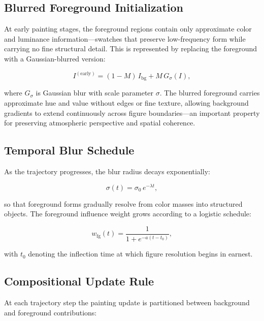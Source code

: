 \documentclass[12pt,a4paper]{article}
\theoremstyle{draftthm}
\begin{document}
\subsection{Blurred Foreground Initialization}

At early painting stages, the foreground regions contain only approximate color and luminance information---swatches that preserve low-frequency form while carrying no fine structural detail. This is represented by replacing the foreground with a Gaussian-blurred version:

\begin{equation}
  I^{(\mathrm{early})} = (1-M)\, I_{\mathrm{bg}} + M\, G_{\sigma}(I),
  \label{eq:early-image}
\end{equation}

where $G_{\sigma}$ is Gaussian blur with scale parameter $\sigma$. The blurred foreground carries approximate hue and value without edges or fine texture, allowing background gradients to extend continuously across figure boundaries---an important property for preserving atmospheric perspective and spatial coherence.

\subsection{Temporal Blur Schedule}

As the trajectory progresses, the blur radius decays exponentially:

\begin{equation}
  \sigma(t) = \sigma_0\, e^{-\lambda t},
  \label{eq:blur-schedule}
\end{equation}

so that foreground forms gradually resolve from color masses into structured objects. The foreground influence weight grows according to a logistic schedule:

\begin{equation}
  w_{\mathrm{fg}}(t) = \frac{1}{1 + e^{-a(t - t_0)}},
  \label{eq:fg-weight}
\end{equation}

with $t_0$ denoting the inflection time at which figure resolution begins in earnest.

\subsection{Compositional Update Rule}

At each trajectory step the painting update is partitioned between background and foreground contributions:
\end{document}
